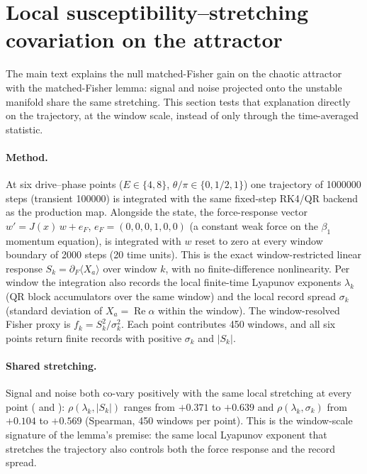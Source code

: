 \documentclass[preprint,numbers,a4paper]{elsarticle}
\begin{document}
\section{Local susceptibility--stretching covariation on the attractor}
\label{SI-sec:local-fisher-stretching}

The main text explains the null matched-Fisher gain on the chaotic attractor with the matched-Fisher lemma: signal and noise projected onto the unstable manifold share the same stretching. This section tests that explanation directly on the trajectory, at the window scale, instead of only through the time-averaged statistic.

\paragraph{Method.}
At six drive--phase points ($E\in\{4,8\}$, $\theta/\pi\in\{0,1/2,1\}$) one trajectory of \num{1000000} steps (transient \num{100000}) is integrated with the same fixed-step RK4/QR backend as the production map. Alongside the state, the force-response vector $w'=J(x)\,w+e_{F}$, $e_{F}=(0,0,0,1,0,0)$ (a constant weak force on the $\beta_{1}$ momentum equation), is integrated with $w$ reset to zero at every window boundary of \num{2000} steps (\num{20} time units). This is the exact window-restricted linear response $S_{k}=\partial_{F}\langle X_{a}\rangle$ over window $k$, with no finite-difference nonlinearity. Per window the integration also records the local finite-time Lyapunov exponents $\lambda_{k}$ (QR block accumulators over the same window) and the local record spread $\sigma_{k}$ (standard deviation of $X_{a}=\operatorname{Re}\alpha$ within the window). The window-resolved Fisher proxy is $f_{k}=S_{k}^{2}/\sigma_{k}^{2}$. Each point contributes \num{450} windows, and all six points return finite records with positive $\sigma_k$ and $|S_k|$.

\paragraph{Shared stretching.}
Signal and noise both co-vary positively with the same local stretching at every point ( and ): $\rho(\lambda_{k},|S_{k}|)$ ranges from $+0.371$ to $+0.639$ and $\rho(\lambda_{k},\sigma_{k})$ from $+0.104$ to $+0.569$ (Spearman, \num{450} windows per point). This is the window-scale signature of the lemma's premise: the same local Lyapunov exponent that stretches the trajectory also controls both the force response and the record spread.
\end{document}
